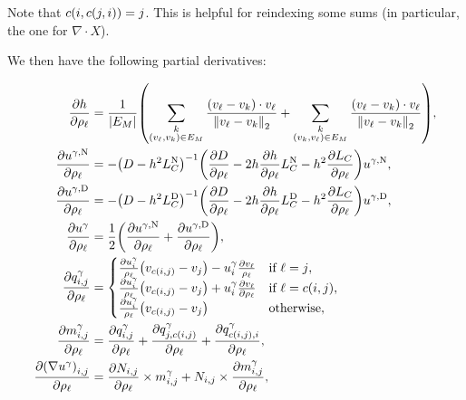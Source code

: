 Note that \(c\pof{i, c\pof{j, i}} = j\). This is helpful for reindexing some sums (in particular, the one for \(\nabla \cdot X\)).

We then have the following partial derivatives:

\begin{align*}
	\frac{\partial h}{\partial \rho_\ell} &= \frac{1}{\abs{E_M}}\pof{\sum_{\substack{k \\ \pof{v_\ell, v_k} \in E_M}} \frac{\pof{v_\ell - v_k} \cdot v_\ell}{\norm{v_\ell - v_k}_2} + \sum_{\substack{k \\ \pof{v_k, v_\ell} \in E_M}} \frac{\pof{v_\ell - v_k} \cdot v_\ell}{\norm{v_\ell - v_k}_2}}, \\
	\frac{\partial u^{\gamma, \text{N}}}{\partial \rho_\ell} &= -\pof{D - h^2L_C^{\text{N}}}^{-1}\pof{\frac{\partial D}{\partial \rho_\ell} - 2h\frac{\partial h}{\partial \rho_\ell}L_C^{\text{N}} - h^2\frac{\partial L_C}{\partial \rho_\ell}}u^{\gamma, \text{N}}, \\
	\frac{\partial u^{\gamma, \text{D}}}{\partial \rho_\ell} &= -\pof{D - h^2L_C^{\text{D}}}^{-1}\pof{\frac{\partial D}{\partial \rho_\ell} - 2h\frac{\partial h}{\partial \rho_\ell}L_C^{\text{D}} - h^2\frac{\partial L_C}{\partial \rho_\ell}}u^{\gamma, \text{D}}, \\
	\frac{\partial u^\gamma}{\partial \rho_\ell} &= \frac{1}{2}\pof{\frac{\partial u^{\gamma, \text{N}}}{\partial \rho_\ell} + \frac{\partial u^{\gamma, \text{D}}}{\partial \rho_\ell}}, \\
	\frac{\partial q^\gamma_{i, j}}{\partial \rho_\ell} &= \begin{cases}
		\frac{\partial u^\gamma_i}{\rho_\ell}\pof{v_{c\pof{i, j}} - v_j} - u^\gamma_i\frac{\partial v_\ell}{\rho_\ell} & \text{if \(\ell = j\)}, \\
		\frac{\partial u^\gamma_i}{\rho_\ell}\pof{v_{c\pof{i, j}} - v_j} + u^\gamma_i\frac{\partial v_\ell}{\partial \rho_\ell} & \text{if \(\ell = c\pof{i, j}\)}, \\
		\frac{\partial u^\gamma_i}{\rho_\ell}\pof{v_{c\pof{i, j}} - v_j} & \text{otherwise},
	\end{cases} \\
	\frac{\partial m^\gamma_{i, j}}{\partial \rho_\ell} &= \frac{\partial q^\gamma_{i, j}}{\partial \rho_\ell} + \frac{\partial q^\gamma_{j, c\pof{i, j}}}{\partial \rho_\ell} + \frac{\partial q^\gamma_{c\pof{i, j}, i}}{\partial \rho_\ell}, \\
	\frac{\partial \pof{\nabla u^\gamma}_{i, j}}{\partial \rho_\ell} &= \frac{\partial N_{i, j}}{\partial \rho_\ell} \times m^\gamma_{i, j} + N_{i, j} \times \frac{\partial m^\gamma_{i, j}}{\partial \rho_\ell}, \\

\end{align*}
